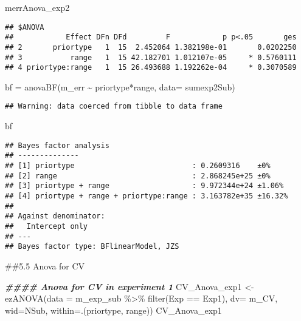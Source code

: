 \documentclass[
]{article}
\newenvironment{Shaded}{\begin{snugshade}}{\end{snugshade}}
\newcommand{\AttributeTok}[1]{\textcolor[rgb]{0.77,0.63,0.00}{#1}}
\newcommand{\DocumentationTok}[1]{\textcolor[rgb]{0.56,0.35,0.01}{\textbf{\textit{#1}}}}
\newcommand{\FunctionTok}[1]{\textcolor[rgb]{0.00,0.00,0.00}{#1}}
\newcommand{\NormalTok}[1]{#1}
\newcommand{\OtherTok}[1]{\textcolor[rgb]{0.56,0.35,0.01}{#1}}
\newcommand{\SpecialCharTok}[1]{\textcolor[rgb]{0.00,0.00,0.00}{#1}}
\newcommand{\StringTok}[1]{\textcolor[rgb]{0.31,0.60,0.02}{#1}}
\begin{document}
\begin{Shaded}
\begin{Highlighting}[]
\NormalTok{merrAnova\_exp2}
\end{Highlighting}
\end{Shaded}

\begin{verbatim}
## $ANOVA
##            Effect DFn DFd         F            p p<.05       ges
## 2       priortype   1  15  2.452064 1.382198e-01       0.0202250
## 3           range   1  15 42.182701 1.012107e-05     * 0.5760111
## 4 priortype:range   1  15 26.493688 1.192262e-04     * 0.3070589
\end{verbatim}

\begin{Shaded}
\begin{Highlighting}[]
\NormalTok{bf }\OtherTok{=} \FunctionTok{anovaBF}\NormalTok{(m\_err }\SpecialCharTok{\textasciitilde{}}\NormalTok{ priortype}\SpecialCharTok{*}\NormalTok{range, }\AttributeTok{data=}\NormalTok{ sumexp2Sub)}
\end{Highlighting}
\end{Shaded}

\begin{verbatim}
## Warning: data coerced from tibble to data frame
\end{verbatim}

\begin{Shaded}
\begin{Highlighting}[]
\NormalTok{bf}
\end{Highlighting}
\end{Shaded}

\begin{verbatim}
## Bayes factor analysis
## --------------
## [1] priortype                           : 0.2609316    ±0%
## [2] range                               : 2.868245e+25 ±0%
## [3] priortype + range                   : 9.972344e+24 ±1.06%
## [4] priortype + range + priortype:range : 3.163782e+35 ±16.32%
## 
## Against denominator:
##   Intercept only 
## ---
## Bayes factor type: BFlinearModel, JZS
\end{verbatim}

\#\#5.5 Anova for CV

\begin{Shaded}
\begin{Highlighting}[]
\DocumentationTok{\#\#\#\# Anova for CV in experiment 1}
\NormalTok{CV\_Anova\_exp1 }\OtherTok{\textless{}{-}} \FunctionTok{ezANOVA}\NormalTok{(}\AttributeTok{data =}\NormalTok{ m\_exp\_sub }\SpecialCharTok{\%\textgreater{}\%} \FunctionTok{filter}\NormalTok{(Exp }\SpecialCharTok{==} \StringTok{\textquotesingle{}Exp1\textquotesingle{}}\NormalTok{), }\AttributeTok{dv=}\NormalTok{ m\_CV, }\AttributeTok{wid=}\NormalTok{NSub, }\AttributeTok{within=}\NormalTok{.(priortype, range))}
\NormalTok{CV\_Anova\_exp1}
\end{Highlighting}
\end{Shaded}
\end{document}
